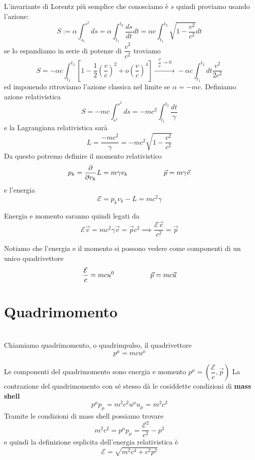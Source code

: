 \documentclass[12pt,a4paper,titlepage, twoside, openright]{book}
\newenvironment{definizione}[1][\empty]{\begin{Definizione}{
\ifx\empty#1\relax\else\mdseries\itshape#1\\\fi
}{}}{\end{Definizione}}
\numberwithin{equation}{chapter}
\begin{document}
L'invariante di Lorentz più semplice che conosciamo è $s$ quindi proviamo usando l'azione:
\[
S:= \alpha \int_{s_1}^{s^2} ds = \alpha \int_{t_1}^{t_2} \dfrac{ds}{dt} dt = \alpha c \int_{t_1}^{t_2} \sqrt{1-\dfrac{v^2}{c^2}} dt
\]
se lo espandiamo in serie di potenze di $\dfrac{v^2}{c^2}$ troviamo
\[
S=-\alpha c \int_{t_1}^{t_2} \left[ 1-\dfrac{1}{2}\left(\dfrac{v}{c}\right)^2 +o\left( \dfrac{v}{c} \right)^4  \right]\overset{\>\>\> \dfrac{v}{c}\rightarrow 0 \>\>\>}{\longrightarrow} -\alpha c \int_{t_1}^{t_2} dt \dfrac{v^2}{2c^2}
\]
ed imponendo ritroviamo l'azione classica nel limite se $\alpha=-mc$.
Definiamo azione relativistica 
\begin{equation}
S=-mc \int_{s^1}^{s^2} ds = -mc^2 \int_{t_1}^{t_2} \dfrac{dt}{\gamma}
\end{equation}
e la Lagrangiana relativistica sarà
\begin{equation}
L=\dfrac{-mc^2}{\gamma}=-mc^2\sqrt{1-\dfrac{v^2}{c^2}}
\end{equation}
Da questo potremo definire il momento relativistico
\begin{equation}
p_k=\dfrac{\partial}{\partial v_k}L = m \gamma v_k \hspace{0.15\linewidth} \vec{p} = m\gamma \vec{v}
\end{equation}
e l'energia
\begin{equation}
\mathcal{E}=p_k v_k - L = mc^2\gamma
\end{equation}

Energia e momento saranno quindi legati da
\[
\mathcal{E} \vec{v}=mc^2\gamma\vec{v}=\vec{p}c^2 \implies \dfrac{\mathcal{E} \vec{v} }{c^2}= \vec{p}
\]

Notiamo che l'energia e il momento si possono vedere come componenti di un unico quadrivettore
\begin{equation}
\dfrac{\mathcal{E}}{c}=mc u^0 \hspace{0.15\linewidth} \vec{p}=mc\vec{u}
\end{equation}

\section{Quadrimomento}
\begin{definizione}
Chiamiamo quadrimomento, o quadrimpulso, il quadrivettore
\[
p^\mu=mcu^\mu
\]
\end{definizione}
Le componenti del quadrimomento sono energia e momento $p^\mu=\left( \dfrac{\mathcal{E}}{c},\vec{p} \right)$
La contrazione del quadrimomento con sé stesso dà le cosiddette condizioni di \textbf{mass shell} 
\[
p^\mu p_\mu= m^2c^2 u^\mu u_\mu = m^2 c^2
\]
Tramite le condizioni di mass shell possiamo trovare
\[
m^2c^2=p^\mu p_\mu = \dfrac{\mathcal{E}^2}{c^2} - p^2 
\]
e quindi la definizione esplicita dell'energia relativistica è
\begin{equation}
\mathcal{E}=\sqrt{m^2c^4+c^2 p^2}
\end{equation}
\end{document}
